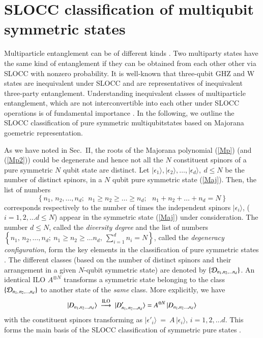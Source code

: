 {\section{SLOCC classification of multiqubit symmetric states} 
\label{classification}
Multiparticle entanglement  can be of different kinds \cite{Dur}. Two multiparty states have the same kind of entanglement if they
can be obtained from each other other via SLOCC with nonzero probability. It is well-known that three-qubit GHZ and W states are inequivalent under SLOCC and are representatives of inequivalent three-party entanglement. Understanding  inequivalent classes of multiparticle entanglement, which are not interconvertible into each other under SLOCC operations is of fundamental importance \cite{Dur,Ver,Lamata,solano}. In the following, we outline \cite{solano} the SLOCC classification of pure symmetric multiqubit\normalfont states based on Majorana goemetric representation.

 As we have noted in Sec.~II,  the roots of the Majorana polynomial (\ref{Mp}) (and (\ref{Mp2})) could be degenerate  and hence not all the  $N$ constituent spinors of a pure symmetric $N$ qubit state are distinct. Let $\vert \epsilon_1\rangle, \vert \epsilon_2\rangle,\ldots, \vert \epsilon_d\rangle,\ d\leq N$ be the number of distinct spinors, in a $N$ qubit pure symmetric state (\ref{Maj}).  Then, the list of numbers $$\left\{n_1,\,n_2,\ldots ,n_d;\ \ n_1\geq n_2\geq\ldots \geq n_d; \ \ \  n_1+n_2+\ldots+n_d=N\right\}$$ 
 corresponds respectively to the number of times the independent spinors $\vert\epsilon_i\rangle$, ($i=1,2,\ldots d\leq N$) appear in the symmetric state (\ref{Maj}) under consideration. The number $d\leq N$, called the {\em diversity degree} and the list of numbers $\left\{n_1,\,n_2,\ldots ,n_d;\  n_1\geq 
n_2\geq \ldots n_d,\  \sum_{i=1}^{d} 
n_i=N\right\}$, called the {\em degeneracy configuration}, form the key elements in the classification of  pure symmetric states \cite{solano}. The different classes  (based on the number of distinct spinors and their arrangement in a given $N$-qubit symmetric state)  are denoted by $\{{\cal D}_{n_1,n_2,\ldots n_d}\}$. 
 An identical ILO $A^{\otimes N}$ transforms a symmetric state belonging to the class $\{ {\cal D}_{n_1,\,n_2,\ldots, n_d}\}$
  to another state of the {\em same} class. More explicitly, we have 
\begin{eqnarray}
\vert D_{n_1,n_2\ldots, n_d}\rangle \ \stackrel{\rm  ILO}{\longrightarrow}\ \vert D'_{n_1,\,n_2\ldots, n_d}\rangle
={A}^{\otimes N}\,\vert D_{n_1,n_2\ldots, n_d}\rangle
\end{eqnarray}  
with the constituent spinors transforming as 
$\vert\epsilon'_i\rangle~=~A\, \vert\epsilon_i\rangle$, $i=1,2,\ldots d$. This forms the main basis of the SLOCC classification of symmetric pure 
states \cite{solano}. 

}

